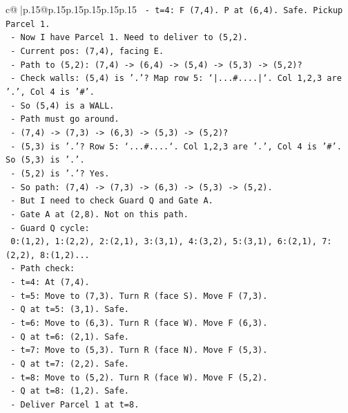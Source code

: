\documentclass{article}
\begin{document}
{\begin{supertabular}{c@{$\;$}|p{.15\linewidth}@{}p{.15\linewidth}p{.15\linewidth}p{.15\linewidth}p{.15\linewidth}p{.15\linewidth}}
{{{\texttt{    {-} t=4: F (7,4). P at (6,4). Safe. Pickup Parcel 1.} \\
\texttt{    {-} Now I have Parcel 1. Need to deliver to (5,2).} \\
\texttt{    {-} Current pos: (7,4), facing E.} \\
\texttt{    {-} Path to (5,2): (7,4) {-}> (6,4) {-}> (5,4) {-}> (5,3) {-}> (5,2)?} \\
\texttt{    {-} Check walls: (5,4) is '.'? Map row 5: `|...\#....|`. Col 1,2,3 are '.', Col 4 is '\#'.} \\
\texttt{    {-} So (5,4) is a WALL.} \\
\texttt{    {-} Path must go around.} \\
\texttt{    {-} (7,4) {-}> (7,3) {-}> (6,3) {-}> (5,3) {-}> (5,2)?} \\
\texttt{    {-} (5,3) is '.'? Row 5: `...\#....`. Col 1,2,3 are '.', Col 4 is '\#'. So (5,3) is '.'.} \\
\texttt{    {-} (5,2) is '.'? Yes.} \\
\texttt{    {-} So path: (7,4) {-}> (7,3) {-}> (6,3) {-}> (5,3) {-}> (5,2).} \\
\texttt{    {-} But I need to check Guard Q and Gate A.} \\
\texttt{    {-} Gate A at (2,8). Not on this path.} \\
\texttt{    {-} Guard Q cycle:} \\
\texttt{      0:(1,2), 1:(2,2), 2:(2,1), 3:(3,1), 4:(3,2), 5:(3,1), 6:(2,1), 7:(2,2), 8:(1,2)...} \\
\texttt{    {-} Path check:} \\
\texttt{      {-} t=4: At (7,4).} \\
\texttt{      {-} t=5: Move to (7,3). Turn R (face S). Move F (7,3).} \\
\texttt{        {-} Q at t=5: (3,1). Safe.} \\
\texttt{      {-} t=6: Move to (6,3). Turn R (face W). Move F (6,3).} \\
\texttt{        {-} Q at t=6: (2,1). Safe.} \\
\texttt{      {-} t=7: Move to (5,3). Turn R (face N). Move F (5,3).} \\
\texttt{        {-} Q at t=7: (2,2). Safe.} \\
\texttt{      {-} t=8: Move to (5,2). Turn R (face W). Move F (5,2).} \\
\texttt{        {-} Q at t=8: (1,2). Safe.} \\
\texttt{    {-} Deliver Parcel 1 at t=8.} \\
}}}
\end{supertabular}}
\end{document}
